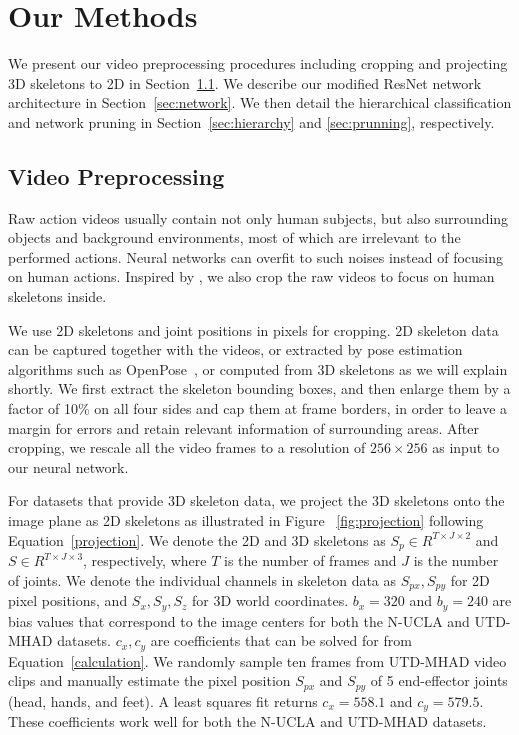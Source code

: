 \documentclass{article}
\begin{document}
 \section{Our Methods}

{We present our video preprocessing procedures including cropping and projecting 3D skeletons to 2D in Section~\ref{sec:preprocessing}. We describe our modified ResNet network architecture in Section~\ref{sec:network}. We then detail the hierarchical classification and network pruning in Section~\ref{sec:hierarchy} and \ref{sec:prunning}, respectively.}

\subsection{Video Preprocessing}
\label{sec:preprocessing}
{Raw action videos usually contain not only human subjects, but also surrounding objects and background environments, most of which are irrelevant to the performed actions. Neural networks can overfit to such noises instead of focusing on human actions. Inspired by \cite{zhu2018action}, we also crop the raw videos to focus on human skeletons inside.}

{We use 2D skeletons and joint positions in pixels for cropping. 2D skeleton data can be captured together with the videos, or extracted by pose estimation algorithms such as OpenPose~\cite{OpenPose}, or computed from 3D skeletons as we will explain shortly. We first extract the skeleton bounding boxes, and then enlarge them by a factor of 10\% on all four sides and cap them at frame borders, in order to leave a margin for errors and retain relevant information of surrounding areas. After cropping, we rescale all the video frames to a resolution of $256 \times 256$ as input to our neural network.}

{For datasets that provide 3D skeleton data, we project the 3D skeletons onto the image plane as 2D skeletons as illustrated in Figure~ \ref{fig:projection} following Equation~\ref{projection}. We denote the 2D and 3D skeletons as $S_p \in R ^ {T \times J \times 2}$ and $S \in R ^ {T \times J \times 3}$, respectively, where $T$ is the number of frames and $J$ is the number of joints. We denote the individual channels in skeleton data as $S_{px}, S_{py}$ for 2D pixel positions, and $S_x, S_y, S_z$ for 3D world coordinates. $b_x=320$ and $b_y=240$ are bias values that correspond to the image centers for both the N-UCLA and UTD-MHAD datasets. $c_x,c_y$ are coefficients that can be solved for from Equation~\ref{calculation}. We randomly sample ten frames from UTD-MHAD video clips and manually estimate the pixel position $S_{px}$ and $S_{py}$ of 5 end-effector joints (head, hands, and feet). A least squares fit returns $c_x=558.1$ and $c_y=579.5$. These coefficients work well for both the N-UCLA and UTD-MHAD datasets.} 
\end{document}
